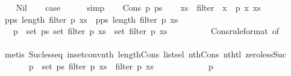 \begin{isabellebody}
\ \ \isamarkupfalse%
\ Nil\isanewline
\ \ \isamarkupfalse%
\ {\isacharquery}case\isanewline
\ \ \ \ \isamarkupfalse%
\ simp\isanewline
{}\isamarkupfalse%
\isanewline
\ \ \isamarkupfalse%
\ {\isacharparenleft}Cons\ p\ ps{\isacharparenright}\isanewline
\ \ \isamarkupfalse%
\ {\isacharquery}xs{\isacharprime}\ {\isacharequal}\ {\isachardoublequoteopen}filter\ {\isacharparenleft}{\isasymlambda}\ x{\isachardot}\ {\isasymnot}\ p\ x{\isacharparenright}\ xs{\isachardoublequoteclose}\isanewline
\ \ \isamarkupfalse%
\ {\isachardoublequoteopen}{\isacharparenleft}{\isasymSum}p{\isasymleftarrow}ps{\isachardot}\ length\ {\isacharparenleft}filter\ p\ xs{\isacharparenright}{\isacharparenright}\ {\isacharequal}\ {\isacharparenleft}{\isasymSum}p{\isasymleftarrow}ps{\isachardot}\ length\ {\isacharparenleft}filter\ p\ {\isacharquery}xs{\isacharprime}{\isacharparenright}{\isacharparenright}{\isachardoublequoteclose}\isanewline
\ \ \isamarkupfalse%
{\isacharminus}\isanewline
\ \ \ \ \isamarkupfalse%
\ {\isacharasterisk}{\isacharcolon}\ {\isachardoublequoteopen}{\isasymforall}\ p{\isacharprime}\ {\isasymin}\ set\ ps{\isachardot}\ set\ {\isacharparenleft}filter\ p\ xs{\isacharparenright}\ {\isasyminter}\ set\ {\isacharparenleft}filter\ p{\isacharprime}\ xs{\isacharparenright}\ {\isacharequal}\ {\isacharbraceleft}{\isacharbraceright}{\isachardoublequoteclose}\isanewline
\ \ \ \ \ \ \isamarkupfalse%
\ Cons{\isacharparenleft}{}{\isacharparenright}{\isacharbrackleft}rule{\isacharunderscore}format{\isacharcomma}\ of\ {}{\isacharbrackright}\isanewline
\ \ \ \ \ \ \isamarkupfalse%
\ {\isacharparenleft}metis\ Suc{\isacharunderscore}less{\isacharunderscore}eq\ in{\isacharunderscore}set{\isacharunderscore}conv{\isacharunderscore}nth\ length{\isacharunderscore}Cons\ list{\isachardot}sel{\isacharparenleft}{}{\isacharparenright}\ nth{\isacharunderscore}Cons{\isacharunderscore}{}\ nth{\isacharunderscore}tl\ zero{\isacharunderscore}less{\isacharunderscore}Suc{\isacharparenright}\isanewline
\ \ \ \ \isamarkupfalse%
\ {\isachardoublequoteopen}{\isasymforall}\ p\ {\isasymin}\ set\ ps{\isachardot}\ filter\ p\ xs\ {\isacharequal}\ filter\ p\ {\isacharquery}xs{\isacharprime}{\isachardoublequoteclose}\isanewline
\ \ \ \ \isamarkupfalse%
\isanewline
\ \ \ \ \ \ \isamarkupfalse%
\ p{\isacharprime}\isanewline
\ \ \ \ \ \ \isamarkupfalse%

\end{isabellebody}
